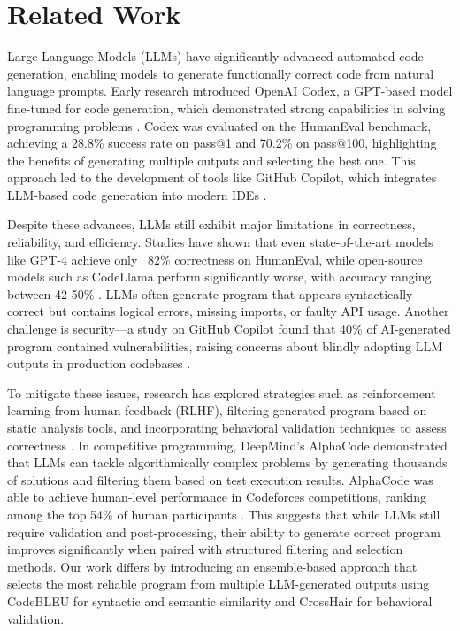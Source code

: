 \documentclass{article}
\begin{document}
\section{Related Work}
Large Language Models (LLMs) have significantly advanced automated code generation, enabling models to generate functionally correct code from natural language prompts. Early research introduced OpenAI Codex, a GPT-based model fine-tuned for code generation, which demonstrated strong capabilities in solving programming problems \cite{chen2021evaluating}. Codex was evaluated on the HumanEval benchmark, achieving a 28.8\% success rate on pass@1 and 70.2\% on pass@100, highlighting the benefits of generating multiple outputs and selecting the best one. This approach led to the development of tools like GitHub Copilot, which integrates LLM-based code generation into modern IDEs \cite{pearce2022asleep}.

Despite these advances, LLMs still exhibit major limitations in correctness, reliability, and efficiency. Studies have shown that even state-of-the-art models like GPT-4 achieve only ~82\% correctness on HumanEval, while open-source models such as CodeLlama perform significantly worse, with accuracy ranging between 42-50\% \cite{bubeck2023sparks, ziemniak2023codellama}. LLMs often generate program that appears syntactically correct but contains logical errors, missing imports, or faulty API usage. Another challenge is security—a study on GitHub Copilot found that 40\% of AI-generated program contained vulnerabilities, raising concerns about blindly adopting LLM outputs in production codebases \cite{pearce2022asleep}.

To mitigate these issues, research has explored strategies such as reinforcement learning from human feedback (RLHF), filtering generated program based on static analysis tools, and incorporating behavioral validation techniques to assess correctness \cite{zhao2022large}. In competitive programming, DeepMind’s AlphaCode demonstrated that LLMs can tackle algorithmically complex problems by generating thousands of solutions and filtering them based on test execution results. AlphaCode was able to achieve human-level performance in Codeforces competitions, ranking among the top 54\% of human participants \cite{li2022competition}. This suggests that while LLMs still require validation and post-processing, their ability to generate correct program improves significantly when paired with structured filtering and selection methods.
Our work differs by introducing an ensemble-based approach that selects the most reliable program from multiple LLM-generated outputs using CodeBLEU for syntactic and semantic similarity and CrossHair for behavioral validation.
\end{document}
